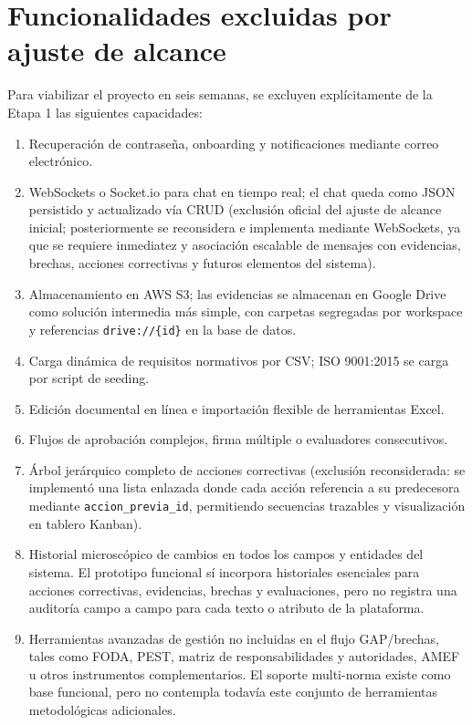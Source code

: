 \documentclass[final]{udpthesis}
\begin{document}
\section{Funcionalidades excluidas por ajuste de alcance}

Para viabilizar el proyecto en seis semanas, se excluyen explícitamente de la Etapa 1 las siguientes capacidades:

\begin{enumerate}
    \item Recuperación de contraseña, onboarding y notificaciones mediante correo electrónico.
    \item WebSockets o Socket.io para chat en tiempo real; el chat queda como JSON persistido y actualizado vía CRUD (exclusión oficial del ajuste de alcance inicial; posteriormente se reconsidera e implementa mediante WebSockets, ya que se requiere inmediatez y asociación escalable de mensajes con evidencias, brechas, acciones correctivas y futuros elementos del sistema).
    \item Almacenamiento en AWS S3; las evidencias se almacenan en Google Drive como solución intermedia más simple, con carpetas segregadas por workspace y referencias \texttt{drive://\{id\}} en la base de datos.
    \item Carga dinámica de requisitos normativos por CSV; ISO 9001:2015 se carga por script de seeding.
    \item Edición documental en línea e importación flexible de herramientas Excel.
    \item Flujos de aprobación complejos, firma múltiple o evaluadores consecutivos.
    \item Árbol jerárquico completo de acciones correctivas (exclusión reconsiderada: se implementó una lista enlazada donde cada acción referencia a su predecesora mediante \texttt{accion\_previa\_id}, permitiendo secuencias trazables y visualización en tablero Kanban).
    \item Historial microscópico de cambios en todos los campos y entidades del sistema. El prototipo funcional sí incorpora historiales esenciales para acciones correctivas, evidencias, brechas y evaluaciones, pero no registra una auditoría campo a campo para cada texto o atributo de la plataforma.
    \item Herramientas avanzadas de gestión no incluidas en el flujo GAP/brechas, tales como FODA, PEST, matriz de responsabilidades y autoridades, AMEF u otros instrumentos complementarios. El soporte multi-norma existe como base funcional, pero no contempla todavía este conjunto de herramientas metodológicas adicionales.
\end{enumerate}
\end{document}
